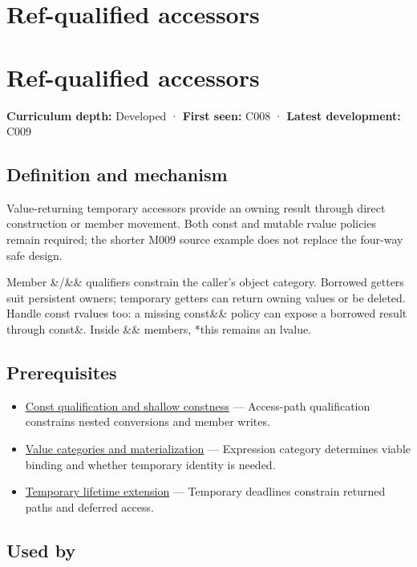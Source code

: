 \hypertarget{appendix-d42039b1d6f7}{}
\section*{Ref-qualified accessors}
\section{Ref-qualified accessors}\label{ref-qualified-accessors}

\textbf{Curriculum depth:} Developed · \textbf{First seen:} C008 · \textbf{Latest development:} C009

\subsection{Definition and mechanism}\label{definition-and-mechanism}

Value-returning temporary accessors provide an owning result through direct construction or member movement. Both const and mutable rvalue policies remain required; the shorter M009 source example does not replace the four-way safe design.

Member \&/\&\& qualifiers constrain the caller's object category. Borrowed getters suit persistent owners; temporary getters can return owning values or be deleted. Handle const rvalues too: a missing const\&\& policy can expose a borrowed result through const\&. Inside \&\& members, *this remains an lvalue.

\subsection{Prerequisites}\label{prerequisites}

\begin{itemize}
\tightlist
\item
  \hyperref[appendix-c25d60fed375]{Const qualification and shallow constness} --- Access-path qualification constrains nested conversions and member writes.
\item
  \hyperref[appendix-1121b30eaeb0]{Value categories and materialization} --- Expression category determines viable binding and whether temporary identity is needed.
\item
  \hyperref[appendix-a978b29bbbb0]{Temporary lifetime extension} --- Temporary deadlines constrain returned paths and deferred access.
\end{itemize}

\subsection{Used by}\label{used-by}

